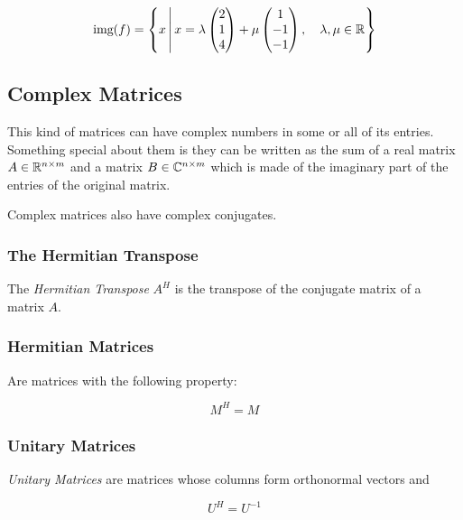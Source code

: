 \[
    \text{img}(f) =
    \left\{
    x \, \middle| \, x = \lambda
    \begin{pmatrix}
    2 \\
    1 \\
    4
    \end{pmatrix} + \mu
    \begin{pmatrix}
    1 \\
    -1 \\
    -1
    \end{pmatrix}
    , \quad \lambda, \mu \in \mathbb{R}
    \right\}
\]

\subsection{Complex Matrices}

This kind of matrices can have complex numbers in some or all of its entries. Something 
special about them is they can be written as the sum of a real matrix \(A \in \mathbb{R}^{n \times m}\) and 
a matrix \(B \in \mathbb{C}^{n \times m}\) which is made of the imaginary part of the entries of the original 
matrix.

Complex matrices also have complex conjugates.


\subsubsection{The Hermitian Transpose}

The \emph{Hermitian Transpose} \(A^H\) is the transpose of the conjugate matrix of a matrix \(A\).

\subsubsection{Hermitian Matrices}

Are matrices with the following property:

\[
    M^H = M
\]

\subsubsection{Unitary Matrices}

\emph{Unitary Matrices} are matrices whose columns form orthonormal vectors and 

\[
    U^H = U^{-1}
\]